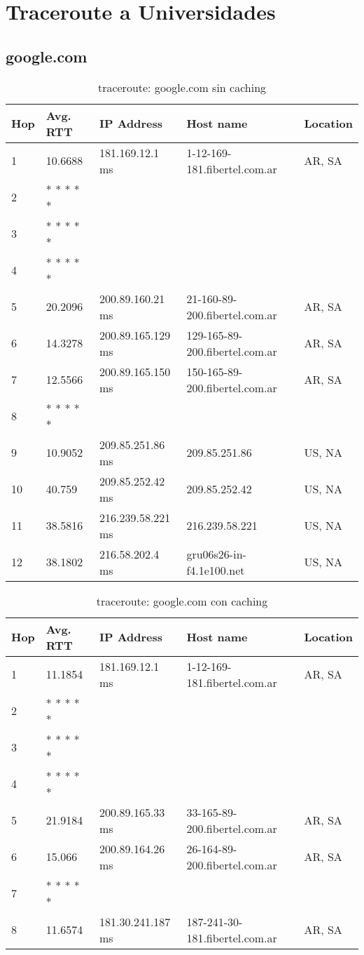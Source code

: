 \section{Traceroute a Universidades}

\subsection{google.com}

\begin{table}[H]
\centering
\begin{tabular}{@{}lllll@{}}
\toprule
Hop & Avg. RTT & IP Address & Host name & Location\\ \midrule
1 & 10.6688 & 181.169.12.1 ms & 1-12-169-181.fibertel.com.ar & AR, SA\\
2 &  * * * * * &  &  &  \\
3 &  * * * * * &  &  &  \\
4 &  * * * * * &  &  &  \\
5 & 20.2096 & 200.89.160.21 ms & 21-160-89-200.fibertel.com.ar & AR, SA\\
6 & 14.3278 & 200.89.165.129 ms & 129-165-89-200.fibertel.com.ar & AR, SA\\
7 & 12.5566 & 200.89.165.150 ms & 150-165-89-200.fibertel.com.ar & AR, SA\\
8 &  * * * * * &  &  &  \\
9 & 10.9052 & 209.85.251.86 ms & 209.85.251.86 & US, NA\\
10 & 40.759 & 209.85.252.42 ms & 209.85.252.42 & US, NA\\
11 & 38.5816 & 216.239.58.221 ms & 216.239.58.221 & US, NA\\
12 & 38.1802 & 216.58.202.4 ms & gru06s26-in-f4.1e100.net & US, NA\\ \bottomrule
\end{tabular}
\caption{traceroute: google.com sin caching}
\label{google}
\end{table}


\begin{table}[H]
\centering
\begin{tabular}{@{}lllll@{}}
\toprule
Hop & Avg. RTT & IP Address & Host name & Location\\ \midrule
1 & 11.1854 & 181.169.12.1 ms & 1-12-169-181.fibertel.com.ar & AR, SA\\
2 &  * * * * * &  &  &  \\
3 &  * * * * * &  &  &  \\
4 &  * * * * * &  &  &  \\
5 & 21.9184 & 200.89.165.33 ms & 33-165-89-200.fibertel.com.ar & AR, SA\\
6 & 15.066 & 200.89.164.26 ms & 26-164-89-200.fibertel.com.ar & AR, SA\\
7 &  * * * * * &  &  &  \\
8 & 11.6574 & 181.30.241.187 ms & 187-241-30-181.fibertel.com.ar & AR, SA\\ \bottomrule
\end{tabular}
\caption{traceroute: google.com con caching}
\label{googlecache}
\end{table}

